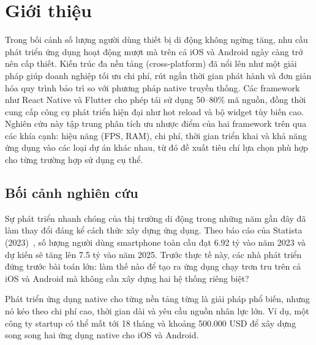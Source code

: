 \section{Giới thiệu}
\begin{flushleft}  
    \hspace*{0.8cm}Trong bối cảnh số lượng người dùng thiết bị di động không ngừng tăng, nhu cầu phát triển ứng dụng hoạt động mượt mà trên cả iOS và Android ngày càng trở nên cấp thiết. Kiến trúc đa nền tảng (cross-platform) đã nổi lên như một giải pháp giúp doanh nghiệp tối ưu chi phí, rút ngắn thời gian phát hành và đơn giản hóa quy trình bảo trì so với phương pháp native truyền thống. Các framework như React Native và Flutter cho phép tái sử dụng 50--80\% mã nguồn, đồng thời cung cấp công cụ phát triển hiện đại như hot reload và bộ widget tùy biến cao. Nghiên cứu này tập trung phân tích ưu nhược điểm của hai framework trên qua các khía cạnh: hiệu năng (FPS, RAM), chi phí, thời gian triển khai và khả năng ứng dụng vào các loại dự án khác nhau, từ đó đề xuất tiêu chí lựa chọn phù hợp cho từng trường hợp sử dụng cụ thể.  
\end{flushleft}

\subsection{Bối cảnh nghiên cứu}
\renewcommand{\labelitemi}{--}    
\begin{flushleft}
    \hspace*{0.8cm}Sự phát triển nhanh chóng của thị trường di động trong những năm gần đây đã làm thay đổi đáng kể cách thức xây dựng ứng dụng. Theo báo cáo của Statista (2023)~\cite{statista2023}, số lượng người dùng smartphone toàn cầu đạt 6.92 tỷ vào năm 2023 và dự kiến sẽ tăng lên 7.5 tỷ vào năm 2025. Trước thực tế này, các nhà phát triển đứng trước bài toán lớn: làm thế nào để tạo ra ứng dụng chạy trơn tru trên cả iOS và Android mà không cần xây dựng hai hệ thống riêng biệt?
\end{flushleft}

\begin{flushleft}
    \hspace*{0.8cm}Phát triển ứng dụng native cho từng nền tảng từng là giải pháp phổ biến, nhưng nó kéo theo chi phí cao, thời gian dài và yêu cầu nguồn nhân lực lớn. Ví dụ, một công ty startup có thể mất tới 18 tháng và khoảng 500.000 USD để xây dựng song song hai ứng dụng native cho iOS và Android.
\end{flushleft}

